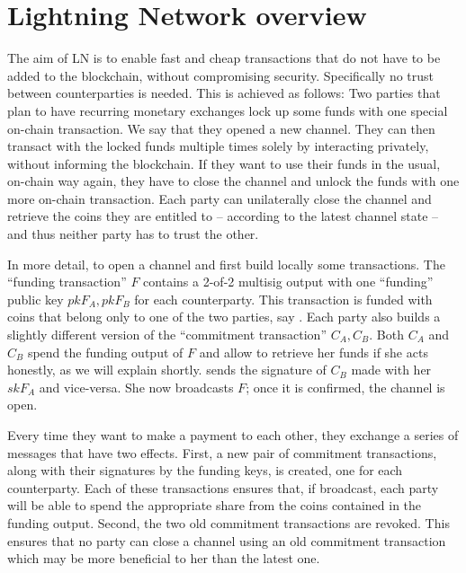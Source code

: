 \section{Lightning Network overview}
\label{sec:ov-lightning}

    The aim of LN is to enable fast and cheap transactions that do not have to
    be added to the blockchain, without compromising security. Specifically no
    trust between counterparties is needed. This is achieved as follows: Two
    parties that plan to have recurring monetary exchanges lock up some funds
    with one special on-chain transaction. We say that they opened a new
    channel. They can then transact with the locked funds multiple times solely
    by interacting privately, without informing the blockchain. If they want to
    use their funds in the usual, on-chain way again, they have to close the
    channel and unlock the funds with one more on-chain transaction. Each party
    can unilaterally close the channel and retrieve the coins they are entitled
    to -- according to the latest channel state -- and thus neither party has to
    trust the other.

    In more detail, to open a channel \alice{} and \bob{} first build locally
    some transactions. The ``funding transaction'' $F$ contains a 2-of-2
    multisig output with one ``funding'' public key $pkF_A, pkF_B$ for each
    counterparty. This transaction is funded with coins that belong only to one
    of the two parties, say \alice. Each party also builds a slightly different
    version of the ``commitment transaction'' $C_A, C_B$. Both $C_A$ and $C_B$
    spend the funding output of $F$ and allow \alice{} to retrieve her funds if
    she acts honestly, as we will explain shortly. \alice{} sends \bob{} the
    signature of $C_B$ made with her $skF_A$ and vice-versa. She now broadcasts
    $F$; once it is confirmed, the channel is open.

    Every time they want to make a payment to each other, they exchange a series
    of messages that have two effects. First, a new pair of commitment
    transactions, along with their signatures by the funding keys, is created,
    one for each counterparty. Each of these transactions ensures that, if
    broadcast, each party will be able to spend the appropriate share from the
    coins contained in the funding output. Second, the two old commitment
    transactions are revoked. This ensures that no party can close a channel
    using an old commitment transaction which may be more beneficial to her than
    the latest one.

